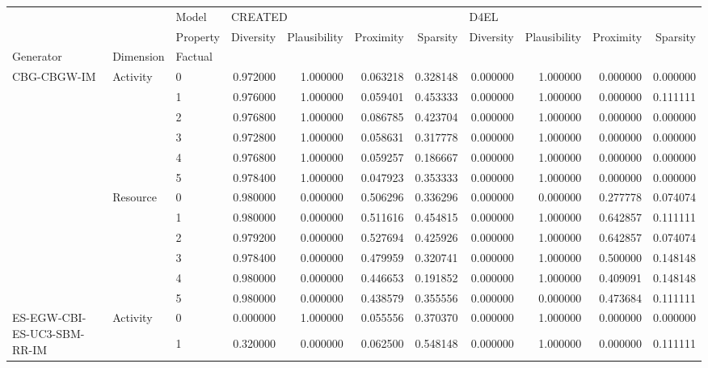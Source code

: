 \begin{tabular}{lllrrrrrrrr}
\toprule
 &  & Model & \multicolumn{4}{l}{CREATED} & \multicolumn{4}{l}{D4EL} \\
 &  & Property & Diversity & Plausibility & Proximity & Sparsity & Diversity & Plausibility & Proximity & Sparsity \\
Generator & Dimension & Factual &  &  &  &  &  &  &  &  \\
\midrule
\multirow[t]{12}{*}{CBG-CBGW-IM} & \multirow[t]{6}{*}{Activity} & 0 & 0.972000 & 1.000000 & 0.063218 & 0.328148 & 0.000000 & 1.000000 & 0.000000 & 0.000000 \\
 &  & 1 & 0.976000 & 1.000000 & 0.059401 & 0.453333 & 0.000000 & 1.000000 & 0.000000 & 0.111111 \\
 &  & 2 & 0.976800 & 1.000000 & 0.086785 & 0.423704 & 0.000000 & 1.000000 & 0.000000 & 0.000000 \\
 &  & 3 & 0.972800 & 1.000000 & 0.058631 & 0.317778 & 0.000000 & 1.000000 & 0.000000 & 0.000000 \\
 &  & 4 & 0.976800 & 1.000000 & 0.059257 & 0.186667 & 0.000000 & 1.000000 & 0.000000 & 0.000000 \\
 &  & 5 & 0.978400 & 1.000000 & 0.047923 & 0.353333 & 0.000000 & 1.000000 & 0.000000 & 0.000000 \\
\cline{2-11}
 & \multirow[t]{6}{*}{Resource} & 0 & 0.980000 & 0.000000 & 0.506296 & 0.336296 & 0.000000 & 0.000000 & 0.277778 & 0.074074 \\
 &  & 1 & 0.980000 & 0.000000 & 0.511616 & 0.454815 & 0.000000 & 1.000000 & 0.642857 & 0.111111 \\
 &  & 2 & 0.979200 & 0.000000 & 0.527694 & 0.425926 & 0.000000 & 1.000000 & 0.642857 & 0.074074 \\
 &  & 3 & 0.978400 & 0.000000 & 0.479959 & 0.320741 & 0.000000 & 1.000000 & 0.500000 & 0.148148 \\
 &  & 4 & 0.980000 & 0.000000 & 0.446653 & 0.191852 & 0.000000 & 1.000000 & 0.409091 & 0.148148 \\
 &  & 5 & 0.980000 & 0.000000 & 0.438579 & 0.355556 & 0.000000 & 0.000000 & 0.473684 & 0.111111 \\
\cline{1-11} \cline{2-11}
\multirow[t]{12}{*}{ES-EGW-CBI-ES-UC3-SBM-RR-IM} & \multirow[t]{6}{*}{Activity} & 0 & 0.000000 & 1.000000 & 0.055556 & 0.370370 & 0.000000 & 1.000000 & 0.000000 & 0.000000 \\
 &  & 1 & 0.320000 & 0.000000 & 0.062500 & 0.548148 & 0.000000 & 1.000000 & 0.000000 & 0.111111 \\

\end{tabular}
